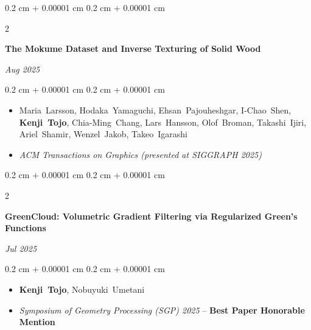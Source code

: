 \documentclass[10pt, letterpaper]{article}
\newenvironment{highlights}{
    \begin{itemize}[
        topsep=0.10 cm,
        parsep=0.10 cm,
        partopsep=0pt,
        itemsep=0pt,
        leftmargin=0.4 cm + 10pt
    ]
}{
    \end{itemize}
} %
\newenvironment{onecolentry}{
    \begin{adjustwidth}{
        0.2 cm + 0.00001 cm
    }{
        0.2 cm + 0.00001 cm
    }
}{
    \end{adjustwidth}
} %
\newenvironment{shorttwocolentry}[2][]{
    \onecolentry
    \def\secondColumn{#2}
    \setcolumnwidth{\fill, 2.5 cm}
    \begin{paracol}{2}
}{
    \switchcolumn \raggedleft \secondColumn
    \end{paracol}
    \endonecolentry
} %
\begin{document}
        \vspace{0.20 cm}
        \begin{samepage}
            \begin{shorttwocolentry}{\textit{Aug 2025}}
                \textbf{The Mokume Dataset and Inverse Texturing of Solid Wood}
            \end{shorttwocolentry}
            \vspace{0.10 cm}
            \begin{onecolentry}
                \begin{highlights}
                    \item
                    \mbox{Maria Larsson},
                    \mbox{Hodaka Yamaguchi},
                    \mbox{Ehsan Pajouheshgar},
                    \mbox{I-Chao Shen},
                    \mbox{\textbf{Kenji Tojo}},
                    \mbox{Chia-Ming Chang},
                    \mbox{Lars Hansson},
                    \mbox{Olof Broman},
                    \mbox{Takashi Ijiri},
                    \mbox{Ariel Shamir},
                    \mbox{Wenzel Jakob},
                    \mbox{Takeo Igarashi}
                    \item \textit{ACM Transactions on Graphics (presented at SIGGRAPH 2025)}
                \end{highlights}
            \end{onecolentry}
        \end{samepage}

        \vspace{0.20 cm}
        \begin{samepage}
            \begin{shorttwocolentry}{\textit{Jul 2025}}
                \textbf{GreenCloud: Volumetric Gradient Filtering via Regularized Green’s Functions}
            \end{shorttwocolentry}
            \vspace{0.10 cm}
            \begin{onecolentry}
            \begin{highlights}
                    \item \mbox{\textbf{Kenji Tojo}}, \mbox{Nobuyuki Umetani}
                    \item \textit{Symposium of Geometry Processing (SGP) 2025} -- \textbf{Best Paper Honorable Mention}
            \end{highlights}
            \end{onecolentry}
        \end{samepage}
\end{document}
